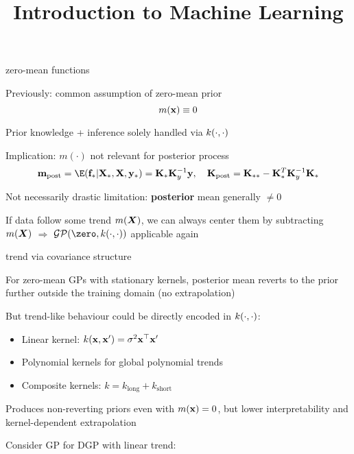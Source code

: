 \documentclass[11pt,compress,t,notes=noshow, xcolor=table]{beamer}
\title{Introduction to Machine Learning}
\begin{document}


\begin{framei}[sep=L]{zero-mean functions}
\item Previously: common assumption of zero-mean prior $$m(\mathbf{x}) \equiv 0$$
\item Prior knowledge + inference solely handled via $k(\cdot, \cdot)$
\item Implication: $m(\cdot)$ not relevant for posterior process
$$\mv_{\text{post}} = \E(\fs | \Xs, \Xmat, \ys) = \Ks \Ky^{-1} \yv, \quad \Kmat_{\text{post}} = \Kss - \Ks^T \Ky^{-1} \Ks$$
\item Not necessarily drastic limitation: \textbf{posterior} mean generally $\neq 0$
\item If data follow some trend $m(\bm{X})$, we can always center them by subtracting $m(\bm{X})$ $\Rightarrow$ $\GPzk$ applicable again
\end{framei}



\begin{framei}[sep=S]{trend via covariance structure}
\item For zero-mean GPs with stationary kernels, posterior mean reverts to the prior further outside the training domain (no extrapolation)
\item But trend-like behaviour could be directly encoded in $k(\cdot, \cdot)$:
\begin{itemize}
  \item Linear kernel: $k(\mathbf{x},\mathbf{x}')=\sigma^2 \mathbf{x}^\top \mathbf{x}'$
  \item Polynomial kernels for global polynomial trends
  \item Composite kernels: $k = k_{\text{long}} + k_{\text{short}}$
\end{itemize}
\item Produces non-reverting priors even with $m(\mathbf{x})=0$, but lower interpretability and kernel-dependent extrapolation
\item Consider GP for DGP with linear trend:

\vfill


\end{framei}
\end{document}
